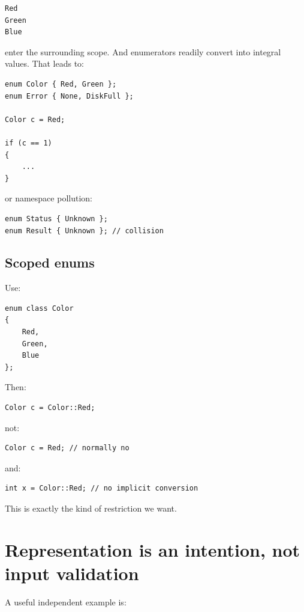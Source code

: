 \begin{verbatim}
Red
Green
Blue
\end{verbatim}

enter the surrounding scope. And enumerators readily convert into integral values. That leads to:

\begin{verbatim}
enum Color { Red, Green };
enum Error { None, DiskFull };

Color c = Red;

if (c == 1)
{
    ...
}
\end{verbatim}

or namespace pollution:

\begin{verbatim}
enum Status { Unknown };
enum Result { Unknown }; // collision
\end{verbatim}

\subsection{Scoped enums}\label{01-foundations-i-ch002-scoped-enums}

Use:

\begin{verbatim}
enum class Color
{
    Red,
    Green,
    Blue
};
\end{verbatim}

Then:

\begin{verbatim}
Color c = Color::Red;
\end{verbatim}

not:

\begin{verbatim}
Color c = Red; // normally no
\end{verbatim}

and:

\begin{verbatim}
int x = Color::Red; // no implicit conversion
\end{verbatim}

This is exactly the kind of restriction we want.

\section{Representation is an intention, not input validation}\label{01-foundations-i-ch002-representation-is-an-intention-not-input-validation}

A useful independent example is:

